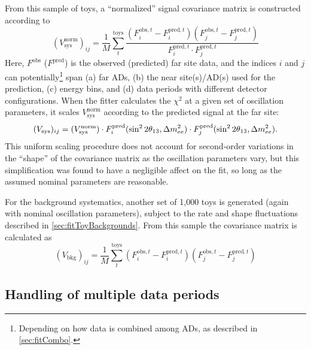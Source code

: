 \documentclass[../thesis.tex]{subfiles}
\begin{document}
From this sample of toys, a ``normalized'' signal covariance matrix is constructed according to
\begin{equation}
  (V^{\mathrm{norm}}_{\mathrm{sys}})_{ij} = \frac{1}{M} \sum_t^{\mathrm{toys}}
  \frac{(F^{\mathrm{obs},t}_i - F^{\mathrm{pred},t}_i)(F^{\mathrm{obs},t}_j - F^{\mathrm{pred},t}_j)}%
       {F^{\mathrm{pred},t}_i \cdot F^{\mathrm{pred},t}_j}
\end{equation}
Here, $F^{\mathrm{obs}}$ ($F^{\mathrm{pred}}$) is the observed (predicted) far site data, and the indices $i$ and $j$ can potentially\footnote{Depending on how data is combined among ADs, as described in \autoref{sec:fitCombo}.} span (a) far ADs, (b) the near site(s)/AD(s) used for the prediction, (c) energy bins, and (d) data periods with different detector configurations. When the fitter calculates the $\chi^2$ at a given set of oscillation parameters, it scales $V^{\mathrm{norm}}_{\mathrm{sys}}$ according to the predicted signal at the far site:
\begin{equation}
  (V_{\mathrm{sys}})_{ij} = (V^{\mathrm{norm}}_{\mathrm{sys}}) \cdot F^{\mathrm{pred}}_i(\sin^2 2\theta_{13}, \Delta m^2_{ee})
  \cdot F^{\mathrm{pred}}_j(\sin^2 2\theta_{13}, \Delta m^2_{ee}).
\end{equation}
This uniform scaling procedure does not account for second-order variations in the ``shape'' of the covariance matrix as the oscillation parameters vary, but this simplification was found to have a negligible affect on the fit, so long as the assumed nominal parameters are reasonable.

For the background systematics, another set of 1,000 toys is generated (again with nominal oscillation parameters), subject to the rate and shape fluctuations described in \autoref{sec:fitToyBackgrounds}. From this sample the covariance matrix is calculated as
\begin{equation}
  (V_{\mathrm{bkg}})_{ij} = \frac{1}{M} \sum_t^{\mathrm{toys}}
  (F^{\mathrm{obs},t}_i - F^{\mathrm{pred},t}_i)(F^{\mathrm{obs},t}_j - F^{\mathrm{pred},t}_j)
\end{equation}

\subsection{Handling of multiple data periods}
\label{sec:fitToyPeriods}
\end{document}
